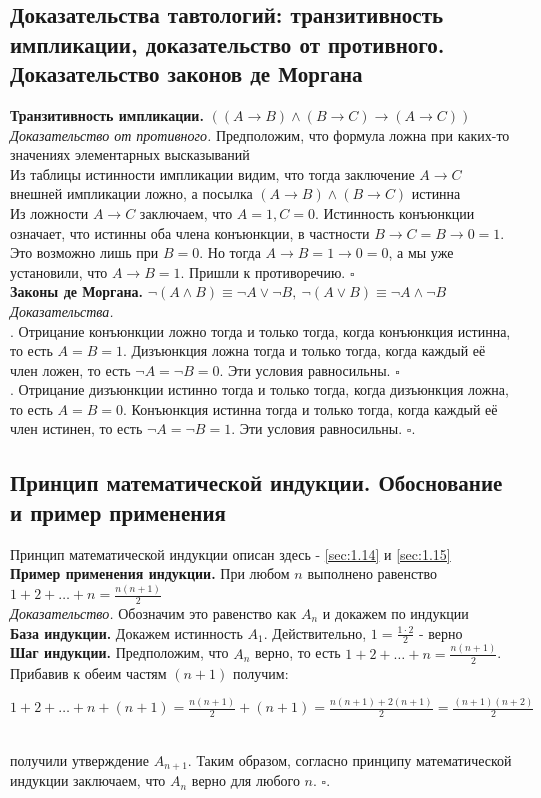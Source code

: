 \documentclass[a4paper]{article}
\newcommand{\qed}{\hfill$\square$}
\begin{document}
\subsection{Доказательства тавтологий: транзитивность импликации, доказательство от противного. Доказательство законов де Моргана}
\textbf{Транзитивность импликации.} $((A\rightarrow B)\wedge(B\rightarrow C)\rightarrow(A\rightarrow C))$\\[2mm]
\textit{Доказательство от противного.} Предположим, что формула ложна при каких-то значениях элементарных высказываний\\[2mm]
\indent Из таблицы истинности импликации видим, что тогда заключение $A\rightarrow C$ внешней импликации ложно, а посылка $(A\rightarrow B)\wedge(B\rightarrow C)$ истинна\\[2mm]
\indent Из ложности $A\rightarrow C$ заключаем, что $A=1, C=0$. Истинность конъюнкции означает, что истинны оба члена конъюнкции, в частности $B\rightarrow C=B\rightarrow0=1$. Это возможно лишь при $B=0$. Но тогда $A\rightarrow B=1\rightarrow0=0$, а мы уже установили, что $A\rightarrow B=1$. Пришли к противоречию. \qed\\[2mm]
\textbf{Законы де Моргана.} $\neg(A\wedge B)\equiv\neg A\vee\neg B,\ \neg(A\vee B)\equiv\neg A\wedge\neg B$\\[2mm]
\textit{Доказательства.}\\[2mm]
. Отрицание конъюнкции ложно тогда и только тогда, когда конъюнкция истинна, то есть $A = B = 1$. Дизъюнкция ложна тогда и только тогда, когда каждый её член ложен, то есть $\neg A=\neg B=0$. Эти условия равносильны. \qed\\[2mm]
. Отрицание дизъюнкции истинно тогда и только тогда, когда дизъюнкция ложна, то есть $A = B = 0$. Конъюнкция истинна тогда и только тогда, когда каждый её член истинен, то есть $\neg A=\neg B=1$. Эти условия равносильны. \qed.
\subsection{Принцип математической индукции. Обоснование и пример применения}
Принцип математической индукции описан здесь - \ref{sec:1.14} и \ref{sec:1.15}\\[2mm]
\textbf{Пример применения индукции.} При любом $n$ выполнено равенство $1+2+\ldots+n=\frac{n(n+1)}{2}$\\[2mm]
\label{sec:2.4}\textit{Доказательство.} Обозначим это равенство как $A_n$ и докажем по индукции\\[2mm]
\indent \textbf{База индукции.} Докажем истинность $A_1$. Действительно, $1=\frac{1\cdot2}{2}$ - верно\\[2mm]
\indent \textbf{Шаг индукции.} Предположим, что $A_n$ верно, то есть $1+2+\ldots+n=\frac{n(n+1)}{2}$. Прибавив к обеим частям $(n+1)$ получим:\\[2mm]
\centerline{$1+2+\ldots+n+(n+1)=\frac{n(n+1)}{2}+(n+1)=\frac{n(n+1)+2(n+1)}{2}=\frac{(n+1)(n+2)}{2}$}\\[2mm]
получили утверждение $A_{n+1}$. Таким образом, согласно принципу математической индукции заключаем, что $A_n$ верно для любого $n$. \qed.
\end{document}
